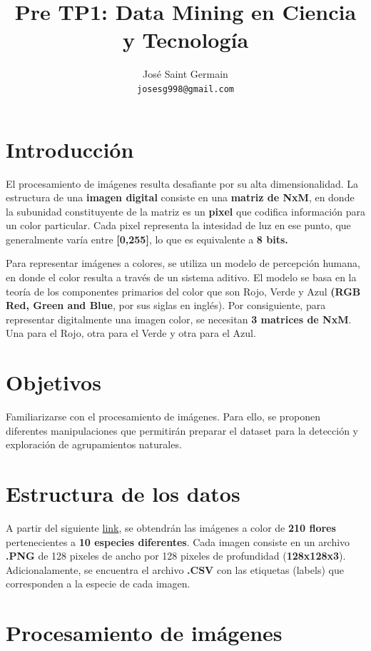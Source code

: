 \documentclass{article}
\title{Pre TP1: Data Mining en Ciencia y Tecnología}
\author{%
  José Saint Germain\\
  \texttt{josesg998@gmail.com} \\
}
\begin{document}
\maketitle

\section{Introducción}

El procesamiento de imágenes resulta desafiante por su alta 
dimensionalidad. La estructura de una {\bf imagen digital} consiste 
en una  {\bf matriz de NxM}, en donde la subunidad constituyente de 
la matriz es un  {\bf pixel} que codifica información para un color 
particular. Cada pixel representa la intesidad de luz en ese 
punto, que generalmente varía entre  {\bf [0,255]}, 
lo que es equivalente a  {\bf8 bits.}\

Para representar imágenes a colores, se utiliza un modelo de 
percepción humana, en donde el color resulta a través de un
sistema aditivo. El modelo se basa en la teoría de los componentes
primarios del color que son Rojo, Verde y Azul  {\bf (RGB Red, Green 
and Blue}, por sus siglas en inglés). Por consiguiente, para 
representar digitalmente una imagen color, se necesitan  {\bf 3 
matrices de NxM}. Una para el Rojo, otra para el Verde y 
otra para el Azul.

\section{Objetivos}


Familiarizarse con el procesamiento de imágenes. Para ello, se proponen 
diferentes manipulaciones que permitirán preparar el dataset para la 
detección y exploración de agrupamientos naturales.

\section{Estructura de los datos}

A partir del siguiente \href{https://www.kaggle.com/datasets/olgabelitskaya/flower-color-images}{link},
se obtendrán las imágenes a color de {\bf 210 flores} pertenecientes a {\bf 10 especies 
diferentes}. Cada imagen consiste en un archivo {\bf .PNG} de 128 pixeles de ancho 
por 128 pixeles de profundidad ({\bf 128x128x3}). Adicionalamente, se encuentra el 
archivo {\bf .CSV} con las etiquetas (labels) que corresponden a la especie de cada imagen.

\section{Procesamiento de imágenes}
\end{document}
